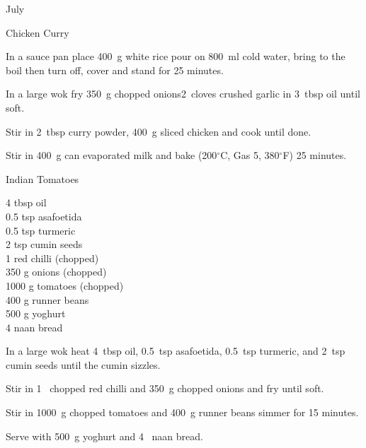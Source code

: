 \begin{menu}{July}
\begin{recipe}{2}{Chicken Curry}
\begin{ingredients}
		\end{ingredients}
	
	
	
    \begin{instructions}
    \item 
    In a
    sauce pan
    place
    400~g  white rice
    pour on
    800~ml  cold water,
    bring to the boil then turn off, cover and stand for 25 minutes.
  \item 
        In a large wok fry
        350~g chopped onions2~cloves crushed garlic
        in
        3~tbsp  oil
        until soft.
      \item 
        Stir in
        2~tbsp  curry powder,
        400~g sliced chicken
        and cook until done.
      \item 
        Stir in
        400~g  can evaporated milk
        and
        bake (200$^{\circ}$C, Gas 5, 380$^{\circ}$F) 25 minutes.
      
    \end{instructions}
    \end{recipe}%
  
    \begin{recipe}{2}{Indian Tomatoes}%
		\begin{ingredients}
		4 tbsp oil  \\
	0.5 tsp asafoetida  \\
	0.5 tsp turmeric  \\
	2 tsp cumin seeds  \\
	1  red chilli (chopped) \\
	350 g onions (chopped) \\
	1000 g tomatoes (chopped) \\
	400 g runner beans  \\
	500 g yoghurt  \\
	4  naan bread  \\
	
		\end{ingredients}
	
	
    \begin{instructions}
    \item 
        In a large wok heat
        4~tbsp  oil,
        0.5~tsp  asafoetida,
        0.5~tsp  turmeric,
        and
        2~tsp  cumin seeds
        until
        the cumin sizzles.
      \item 
        Stir in
        1~ chopped red chilli
        and
        350~g chopped onions
        and
        fry until soft.
      \item 
        Stir in
        1000~g chopped tomatoes
        and
        400~g  runner beans
        simmer for 15 minutes.
      \item 
        Serve with
        500~g  yoghurt
        and
        4~  naan bread.
      

\end{instructions}
\end{recipe}
\end{menu}
